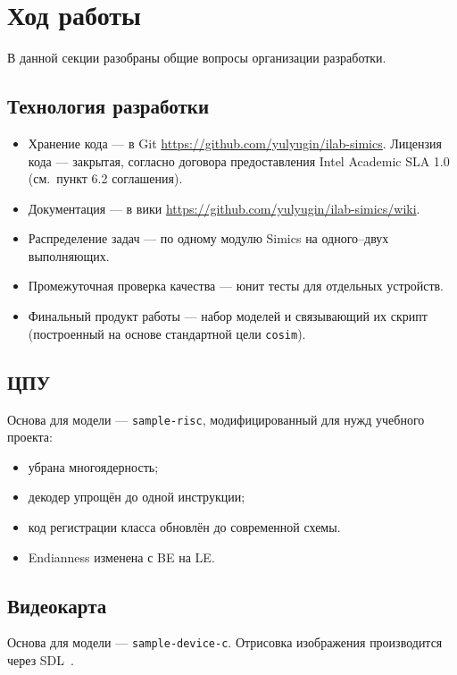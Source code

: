 \section{Ход работы}

В данной секции разобраны общие вопросы организации разработки.
\subsection{Технология разработки}

\begin{itemize}
\item Хранение кода --- в Git \url{https://github.com/yulyugin/ilab-simics}. Лицензия кода --- закрытая, согласно договора предоставления Intel Academic SLA 1.0 (см.~пункт 6.2 соглашения).

\item Документация --- в вики \url{https://github.com/yulyugin/ilab-simics/wiki}.

\item Распределение задач --- по одному модулю Simics на одного--двух выполняющих.
\item Промежуточная проверка качества --- юнит тесты для отдельных устройств.
\item Финальный продукт работы --- набор моделей и связывающий их скрипт (построенный на основе стандартной цели \texttt{cosim}).
\end{itemize}

\subsection{ЦПУ}

Основа для модели --- \texttt{sample-risc}, модифицированный для нужд учебного проекта:
\begin{itemize}
    \item убрана многоядерность;
    \item декодер упрощён до одной инструкции;
	\item код регистрации класса обновлён до современной схемы.
	\item Endianness изменена с BE на LE.
\end{itemize}


\subsection{Видеокарта}

Основа для модели --- \texttt{sample-device-c}. Отрисовка изображения производится через SDL~\cite{sdl2-wiki}.

